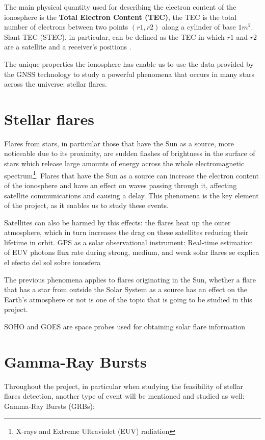 The main physical quantity used for describing the electron content of the ionosphere is the \textbf{Total Electron Content (TEC)}, the TEC is the total number of electrons between two points $(r1,r2)$ along a cylinder of base $1m^2$. 
Slant TEC (STEC), in particular, can be defined as the TEC in which $r1$ and $r2$ are a satellite and a receiver’s positions \cite{singh2015gps}. 

The unique properties the ionosphere has enable us to use the data provided by the GNSS technology to study a powerful phenomena that occurs in many stars across the universe: stellar flares.

\section{Stellar flares}

Flares from stars, in particular those that have the Sun as a source, more noticeable due to its proximity, are sudden flashes of brightness in the surface of stars which release large amounts of energy across the whole electromagnetic spectrum\footnote{X-rays and Extreme Ultraviolet (EUV) radiation}.
Flares that have the Sun as a source can increase the electron content of the ionosphere and have an effect on waves passing through it, affecting satellite communications and causing a delay. This phenomena is the key element of the project, as it enables us to study these events.

Satellites can also be harmed by this effects: the flares heat up the outer atmosphere, which in turn increases the drag on these satellites reducing their lifetime in orbit.
{GPS as a solar observational instrument: Real-time estimation of EUV photons flux rate during strong, medium, and weak solar flares se explica el efecto del sol sobre ionosfera}

The previous phenomena applies to flares originating in the Sun, whether a flare that has a star from outside the Solar System as a source has an effect on the Earth’s atmosphere or not is one of the topic that is going to be studied in this project.

SOHO and GOES are space probes used for obtaining solar flare information \cite{hernandez2012gnss}

\section{Gamma-Ray Bursts}

Throughout the project, in particular when studying the feasibility of stellar flares detection, another type of event will be mentioned and studied as well: Gamma-Ray Bursts (GRBs):

